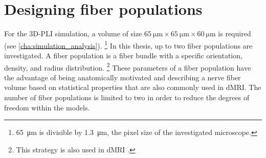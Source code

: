 \section{Designing fiber populations}
%
For the \ac{3D-PLI} simulation, a volume of size $\SI{65}{\micro\meter} \times \SI{65}{\micro\meter} \times \SI{60}{\micro\meter}$ is required (see \cref{cha:simulation_analysis}). \footnote{\SI{65}{\micro\meter} is divisible by \SI{1.3}{\micro\meter}, the pixel size of the investigated microscope.}
In this thesis, up to two fiber populations are investigated.
A fiber population is a fiber bundle with a specific orientation, density, and radius distribution.
\footnote{This strategy is also used in \ac{dMRI} \cite{Ginsburger2018,Ginsburger2019,ginsburgerDis2019}.}
These parameters of a fiber population have the advantage of being anatomically motivated and describing a nerve fiber volume based on statistical properties that are also commonly used in \ac{dMRI}.
The number of fiber populations is limited to two in order to reduce the degrees of freedom within the models.
%
% 
% 
